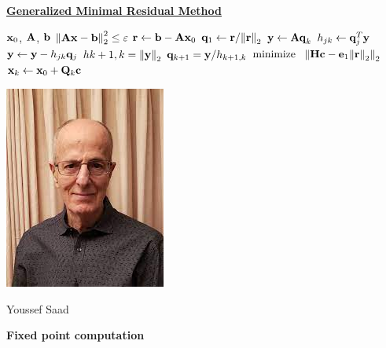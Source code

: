 \documentclass[aspectratio=169, usenames, dvipsnames]{beamer}
\DeclareMathOperator*{\minimize}{minimize~}
\begin{document}
\begin{frame}
  \vfill
  \centering
  \underline{\textbf{Generalized Minimal Residual Method}}

  \vfill

  \begin{minipage}{.48\textwidth}
    \begin{algorithmic}
      \Require $\vb{x}_0$, $\vb{A}$, $\vb{b}$
      \Ensure $\norm{\vb{Ax} - \vb{b}}_2^2 \leq \varepsilon$
      \State $\vb{r} \gets \vb{b} - \vb{Ax}_0$
      \State $\vb{q}_1 \gets \vb{r} / \norm{\vb{r}}_2$
      \State $\vb{y} \gets \vb{Aq}_k$
      \State $h_{jk} \gets \vb{q}^T_j \vb{y}$
      \State $\vb{y} \gets \vb{y} - h_{jk} \vb{q}_j$
      \EndFor
      \State $h{k+1, k} = \norm{\vb{y}}_2$
      \State $\vb{q}_{k+1} = \vb{y} / h_{k+1, k}$
      \State $\minimize~\norm{\vb{Hc} - \vb{e}_1 \norm{\vb{r}}_2}_2$
      \State $\vb{x}_k \gets \vb{x}_0 + \vb{Q}_k \vb{c}$
      \EndFor
    \end{algorithmic}
  \end{minipage}%
  \hfill
  \begin{minipage}{.48\textwidth}
    \centering
    \includegraphics[width=.6\textwidth]{saad}

    {\tiny
      Youssef Saad
    }
  \end{minipage}
  
  \vfill
\end{frame}

\begin{frame}
  \vfill
  \begin{minipage}{.48\textwidth}
    \centering
    {
      \huge
      \textbf{Fixed point computation}
    }
  \end{minipage}%
  \hfill
  \begin{minipage}{.48\textwidth}
  \end{minipage}

  \vfill
\end{frame}
\end{document}
